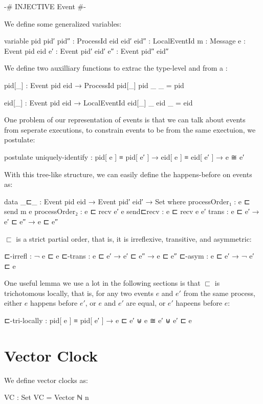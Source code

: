\documentclass[acmsmall,review,anonymous]{acmart}
\theoremstyle{definition}
\theoremstyle{theorem}
\begin{document}
\begin{code}[hide]
{-# INJECTIVE Event #-}
\end{code}

We define some generalized variables:
\begin{code}
variable
  pid pid′ pid″ : ProcessId
  eid eid′ eid″ : LocalEventId
  m  : Message
  e  : Event pid  eid
  e′ : Event pid′ eid′
  e″ : Event pid″ eid″
\end{code}

We define two auxilliary functions to extrac the type-level
 and  from a :
\begin{code}
pid[_] : Event pid eid → ProcessId
pid[_] {pid} {_} _ = pid

eid[_] : Event pid eid → LocalEventId
eid[_] {_} {eid} _ = eid
\end{code}

One problem of our representation of events is that we can talk about
events from seperate executions, to constrain events to be from the
same exectuion, we postulate:
\begin{code}
postulate
  uniquely-identify : pid[ e ] ≡ pid[ e′ ] → eid[ e ] ≡ eid[ e′ ] → e ≅ e′
\end{code}

With this tree-like structure, we can easily define the happens-before
on events as:
\begin{code}
data _⊏_ : Event pid eid → Event pid′ eid′ → Set where
  processOrder₁  : e ⊏ send m e
  processOrder₂  : e ⊏ recv e′ e
  send⊏recv      : e ⊏ recv e  e′
  trans          : e ⊏ e′ → e′ ⊏ e″ → e ⊏ e″
\end{code}

$\sqsubset$ is a strict partial order, that is, it is irreflexive,
transitive, and asymmetric:
\begin{code}
⊏-irrefl : ¬ e ⊏ e
⊏-trans : e ⊏ e′ → e′ ⊏ e″ → e ⊏ e″
⊏-asym : e ⊏ e′ → ¬ e′ ⊏ e
\end{code}

One useful lemma we use a lot in the following sections is that $\sqsubset$ is trichotomous locally, that is, for any two events $e$ and $e'$ from the same process, either $e$ happens before $e'$, or $e$ and $e'$ are equal, or $e'$ hapeens before $e$:
\begin{code}
⊏-tri-locally : pid[ e ] ≡ pid[ e′ ] → e ⊏ e′ ⊎ e ≅ e′ ⊎ e′ ⊏ e
\end{code}

\section{Vector Clock}
We define vector clocks as:
\begin{code}
VC : Set
VC = Vector ℕ n
\end{code}
\end{document}
